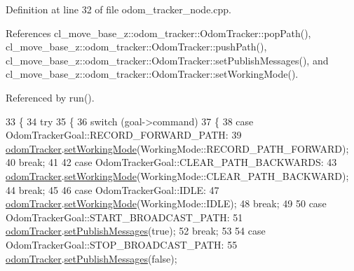 Definition at line 32 of file odom\+\_\+tracker\+\_\+node.\+cpp.



References cl\+\_\+move\+\_\+base\+\_\+z\+::odom\+\_\+tracker\+::\+Odom\+Tracker\+::pop\+Path(), cl\+\_\+move\+\_\+base\+\_\+z\+::odom\+\_\+tracker\+::\+Odom\+Tracker\+::push\+Path(), cl\+\_\+move\+\_\+base\+\_\+z\+::odom\+\_\+tracker\+::\+Odom\+Tracker\+::set\+Publish\+Messages(), and cl\+\_\+move\+\_\+base\+\_\+z\+::odom\+\_\+tracker\+::\+Odom\+Tracker\+::set\+Working\+Mode().



Referenced by run().


\begin{DoxyCode}
33   \{
34     \textcolor{keywordflow}{try}
35     \{
36       \textcolor{keywordflow}{switch} (goal->command)
37       \{
38       \textcolor{keywordflow}{case} OdomTrackerGoal::RECORD\_FORWARD\_PATH:
39         \hyperlink{classOdomTrackerActionServer_a3e5c4328d3206fbd2fd2708f0aefe651}{odomTracker}.\hyperlink{classcl__move__base__z_1_1odom__tracker_1_1OdomTracker_aeed01bdefd9a1cc709b0b3e4eed285ed}{setWorkingMode}(WorkingMode::RECORD\_PATH\_FORWARD);
40         \textcolor{keywordflow}{break};
41 
42       \textcolor{keywordflow}{case} OdomTrackerGoal::CLEAR\_PATH\_BACKWARDS:
43         \hyperlink{classOdomTrackerActionServer_a3e5c4328d3206fbd2fd2708f0aefe651}{odomTracker}.\hyperlink{classcl__move__base__z_1_1odom__tracker_1_1OdomTracker_aeed01bdefd9a1cc709b0b3e4eed285ed}{setWorkingMode}(WorkingMode::CLEAR\_PATH\_BACKWARD);
44         \textcolor{keywordflow}{break};
45 
46       \textcolor{keywordflow}{case} OdomTrackerGoal::IDLE:
47         \hyperlink{classOdomTrackerActionServer_a3e5c4328d3206fbd2fd2708f0aefe651}{odomTracker}.\hyperlink{classcl__move__base__z_1_1odom__tracker_1_1OdomTracker_aeed01bdefd9a1cc709b0b3e4eed285ed}{setWorkingMode}(WorkingMode::IDLE);
48         \textcolor{keywordflow}{break};
49 
50       \textcolor{keywordflow}{case} OdomTrackerGoal::START\_BROADCAST\_PATH:
51         \hyperlink{classOdomTrackerActionServer_a3e5c4328d3206fbd2fd2708f0aefe651}{odomTracker}.\hyperlink{classcl__move__base__z_1_1odom__tracker_1_1OdomTracker_a3b3cf9010e4e4fe4f96cfafd5a529517}{setPublishMessages}(\textcolor{keyword}{true});
52         \textcolor{keywordflow}{break};
53 
54       \textcolor{keywordflow}{case} OdomTrackerGoal::STOP\_BROADCAST\_PATH:
55         \hyperlink{classOdomTrackerActionServer_a3e5c4328d3206fbd2fd2708f0aefe651}{odomTracker}.\hyperlink{classcl__move__base__z_1_1odom__tracker_1_1OdomTracker_a3b3cf9010e4e4fe4f96cfafd5a529517}{setPublishMessages}(\textcolor{keyword}{false});

\end{DoxyCode}
